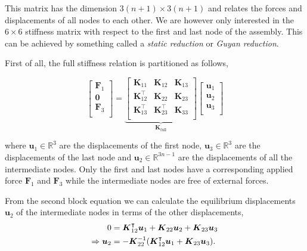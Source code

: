 This matrix has the dimension $3(n+1) \times 3(n+1)$ and relates the forces and displacements of all nodes to each other.
We are however only interested in the $6 \times 6$ stiffness matrix with respect to the first and last node of the assembly.
This can be achieved by something called a \textit{static reduction} or \textit{Guyan reduction}.

First of all, the full stiffness relation is partitioned as follows,

\begin{equation}
\begin{bmatrix}
\boldsymbol{F}_{1} \\
\boldsymbol{0} \\
\boldsymbol{F}_{3} \\
\end{bmatrix}
=
\underbrace{
\begin{bmatrix}
          \boldsymbol{K}_{11} &           \boldsymbol{K}_{12} & \boldsymbol{K}_{13} \\
\boldsymbol{K}_{12}^\intercal &           \boldsymbol{K}_{22} & \boldsymbol{K}_{23} \\
\boldsymbol{K}_{13}^\intercal & \boldsymbol{K}_{23}^\intercal & \boldsymbol{K}_{33} \\
\end{bmatrix}
}_{\boldsymbol{K}_{\mathrm{full}}}
\begin{bmatrix}
\boldsymbol{u}_{1} \\
\boldsymbol{u}_{2} \\
\boldsymbol{u}_{3} \\
\end{bmatrix}
\end{equation}

where $\boldsymbol{u}_1 \in \mathbb{R}^3$ are the displacements of the first node, $\boldsymbol{u}_3 \in \mathbb{R}^3$ are the displacements of the last node and $\boldsymbol{u}_2 \in \mathbb{R}^{3n-1}$ are the displacements of all the intermediate nodes.
Only the first and last nodes have a corresponding applied force $\boldsymbol{F}_{1}$ and $\boldsymbol{F}_{3}$ while the intermediate nodes are free of external forces.

From the second block equation we can calculate the equilibrium displacements $\boldsymbol{u}_{2}$ of the intermediate nodes in terms of the other displacements,
%
\begin{align}
0 &= \boldsymbol{K}_{12}^\intercal \boldsymbol{u}_1 + \boldsymbol{K}_{22}\boldsymbol{u}_2 + \boldsymbol{K}_{23}\boldsymbol{u}_3 \notag \\
\Rightarrow \boldsymbol{u}_2 &= -\boldsymbol{K}_{22}^{-1}(\boldsymbol{K}_{12}^\intercal \boldsymbol{u}_1 + \boldsymbol{K}_{23}\boldsymbol{u}_3).
\end{align}

